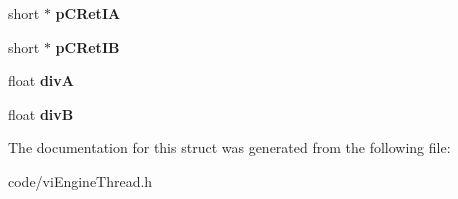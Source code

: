 \begin{DoxyCompactItemize}
\item 
\hypertarget{struct_c_v_i_engine_thread_1_1tag_s_u_m_m___p_t_r_ae70b246b8b7b3ed620dab1b0ef05a4cb}{short $\ast$ {\bfseries p\+C\+Ret\+I\+A}}\label{struct_c_v_i_engine_thread_1_1tag_s_u_m_m___p_t_r_ae70b246b8b7b3ed620dab1b0ef05a4cb}

\item 
\hypertarget{struct_c_v_i_engine_thread_1_1tag_s_u_m_m___p_t_r_aaa56bf06649601e5435f12493606b8bf}{short $\ast$ {\bfseries p\+C\+Ret\+I\+B}}\label{struct_c_v_i_engine_thread_1_1tag_s_u_m_m___p_t_r_aaa56bf06649601e5435f12493606b8bf}

\item 
\hypertarget{struct_c_v_i_engine_thread_1_1tag_s_u_m_m___p_t_r_a47e9d40cf2c8b3ea06664f16db1a6c1b}{float {\bfseries div\+A}}\label{struct_c_v_i_engine_thread_1_1tag_s_u_m_m___p_t_r_a47e9d40cf2c8b3ea06664f16db1a6c1b}

\item 
\hypertarget{struct_c_v_i_engine_thread_1_1tag_s_u_m_m___p_t_r_a01008dd478175bacaab9f9751a04c551}{float {\bfseries div\+B}}\label{struct_c_v_i_engine_thread_1_1tag_s_u_m_m___p_t_r_a01008dd478175bacaab9f9751a04c551}

\end{DoxyCompactItemize}


The documentation for this struct was generated from the following file\+:\begin{DoxyCompactItemize}
\item 
code/vi\+Engine\+Thread.\+h\end{DoxyCompactItemize}
